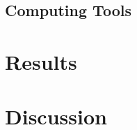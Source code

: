 \documentclass[11pt, a4paper]{article} %
\begin{document}
\subsection{Computing Tools}


\section{Results}

\section{Discussion}



%
\end{document}
